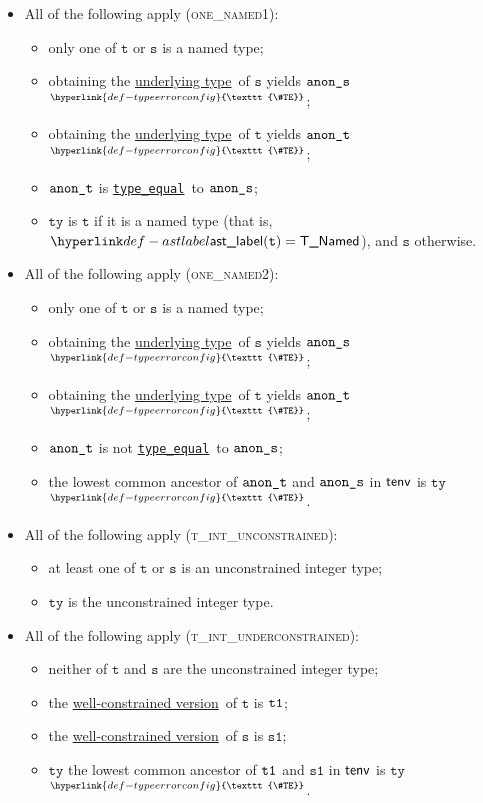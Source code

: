 \documentclass{book}
\newcommand\TypeErrorConfig[0]{\hyperlink{def-typeerrorconfig}{\texttt{\#TE}}}
\newcommand\ProseOrTypeError[0]{\hyperlink{def-proseortypeerror}{$^{\TypeErrorConfig}$}}
\newcommand\typeequal[0]{\hyperlink{def-typeequal}{\texttt{type\_equal}}}
\newcommand\underlyingtype[0]{\hyperlink{def-underlyingtype}{underlying type}}
\newcommand\wellconstrainedversion[0]{\hyperlink{def-towellconstrained}{well-constrained version}}
\newcommand\vt[0]{\texttt{t}}
\newcommand\vs[0]{\texttt{s}}
\newcommand\vsone[0]{\texttt{s1}}
\newcommand\tty[0]{\texttt{ty}}
\begin{document}
\begin{itemize}
\begin{itemize}
    \item All of the following apply (\textsc{one\_named1}):
    \begin{itemize}
      \item only one of $\vt$ or $\vs$ is a named type;
      \item obtaining the \underlyingtype\ of $\vs$ yields $\texttt{anon\_s}$ \ProseOrTypeError;
      \item obtaining the \underlyingtype\ of $\vt$ yields $\texttt{anon\_t}$ \ProseOrTypeError;
      \item $\texttt{anon\_t}$ is \typeequal\ to $\texttt{anon\_s}$;
      \item $\tty$ is $\vt$ if it is a named type (that is, $\astlabel(\vt)=\TNamed$), and $\vs$ otherwise.
    \end{itemize}

    \item All of the following apply (\textsc{one\_named2}):
    \begin{itemize}
      \item only one of $\vt$ or $\vs$ is a named type;
      \item obtaining the \underlyingtype\ of $\vs$ yields $\texttt{anon\_s}$ \ProseOrTypeError;
      \item obtaining the \underlyingtype\ of $\vt$ yields $\texttt{anon\_t}$ \ProseOrTypeError;
      \item $\texttt{anon\_t}$ is not \typeequal\ to $\texttt{anon\_s}$;
      \item the lowest common ancestor of $\texttt{anon\_t}$ and $\texttt{anon\_s}$ in $\textsf{tenv}$ is $\tty$ \ProseOrTypeError.
    \end{itemize}

    \item All of the following apply (\textsc{t\_int\_unconstrained}):
    \begin{itemize}
      \item at least one of $\vt$ or $\vs$ is an unconstrained integer type;
      \item $\tty$ is the unconstrained integer type.
    \end{itemize}

    \item All of the following apply (\textsc{t\_int\_underconstrained}):
    \begin{itemize}
      \item neither of $\vt$ and $\vs$ are the unconstrained integer type;
      \item the \wellconstrainedversion\ of $\vt$ is $\texttt{t1}$;
      \item the \wellconstrainedversion\ of $\vs$ is $\vsone$;
      \item $\tty$ the lowest common ancestor of $\texttt{t1}$ and $\vsone$ in $\textsf{tenv}$ is $\tty$ \ProseOrTypeError.
    \end{itemize}


\end{itemize}
\end{itemize}
\end{document}
